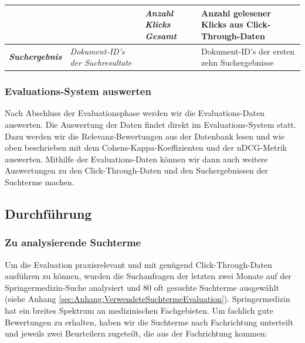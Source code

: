 \begin{table}[H]
{\begin{tabular}{llll}
                                                       & \textit{}                                & \textit{Anzahl Klicks Gesamt}            & Anzahl gelesener Klicks aus Click-Through-Daten    \\ \hline
\textit{\textbf{Suchergebnis}}                         & \textit{Dokument-ID's der Suchresultate} & \textit{}                                & Dokument-ID's der ersten zehn Suchergebnisse       \\ \hline
\end{tabular}
}
\vspace{-2em}
\end{table}

\subsubsection{Evaluations-System auswerten}
\label{sec:Evaluation:Aufbau:Vorgehen:Auswerten}

Nach Abschluss der Evaluationsphase werden wir die Evaluations-Daten auswerten. Die Auswertung der Daten findet direkt im Evaluations-System statt. Dazu werden wir die Relevanz-Bewertungen aus der Datenbank lesen und wie oben beschrieben mit dem Cohens-Kappa-Koeffizienten und der nDCG-Metrik auswerten. Mithilfe der Evaluations-Daten können wir dann auch weitere Auswertungen zu den Click-Through-Daten und den Suchergebnissen der Suchterme machen.

\pagebreak

\subsection{Durchführung}
\label{sec:Evaluation:Aufbau:Durchfuehrung}

\subsubsection{Zu analysierende Suchterme}
\label{sec:Evaluation:Aufbau:Durchfuehrung:Aufgabenstellung}

Um die Evaluation praxisrelevant und mit genügend Click-Through-Daten ausführen zu können, wurden die Suchanfragen der letzten zwei Monate auf der Springermedizin-Suche analysiert und 80 oft gesuchte Suchterme ausgewählt (siehe Anhang \ref{sec:Anhang:VerwendeteSuchtermeEvaluation}). Springermedizin hat ein breites Spektrum an medizinischen Fachgebieten. Um fachlich gute Bewertungen zu erhalten, haben wir die Suchterme nach Fachrichtung unterteilt und jeweils zwei Beurteilern zugeteilt, die aus der Fachrichtung kommen:

